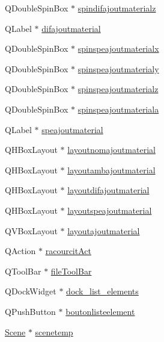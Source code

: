 \begin{DoxyCompactItemize}
\item 
Q\+Double\+Spin\+Box $\ast$ \hyperlink{class_main_window_adbf1bc80b252c00419abec7da5e19913}{spindifajoutmaterialz}
\item 
Q\+Label $\ast$ \hyperlink{class_main_window_a8bbcda89f3ac6367c000056b7e6acb5f}{difajoutmaterial}
\item 
Q\+Double\+Spin\+Box $\ast$ \hyperlink{class_main_window_a41b46a41873912e43f60feafeec48f2f}{spinspeajoutmaterialx}
\item 
Q\+Double\+Spin\+Box $\ast$ \hyperlink{class_main_window_af5f3e81215640c685afbe36ea30926eb}{spinspeajoutmaterialy}
\item 
Q\+Double\+Spin\+Box $\ast$ \hyperlink{class_main_window_abfa1370458910b22754b3a2f9dcf8079}{spinspeajoutmaterialz}
\item 
Q\+Double\+Spin\+Box $\ast$ \hyperlink{class_main_window_ada80e183d94aca69af5b4b413b283a41}{spinspeajoutmateriala}
\item 
Q\+Label $\ast$ \hyperlink{class_main_window_a464561ddbc54d9ced72ad2e1bd76c582}{speajoutmaterial}
\item 
Q\+H\+Box\+Layout $\ast$ \hyperlink{class_main_window_adf5b4cec63e1fb74cfa99d9ff9e72b8d}{layoutnomajoutmaterial}
\item 
Q\+H\+Box\+Layout $\ast$ \hyperlink{class_main_window_ac7c260f905c9235339c200e7fa4e6258}{layoutambajoutmaterial}
\item 
Q\+H\+Box\+Layout $\ast$ \hyperlink{class_main_window_acf1014fb28677dc578d33bf3c4b8729b}{layoutdifajoutmaterial}
\item 
Q\+H\+Box\+Layout $\ast$ \hyperlink{class_main_window_adac5730b1a8e83ec6c59d531d9f7ba4e}{layoutspeajoutmaterial}
\item 
Q\+V\+Box\+Layout $\ast$ \hyperlink{class_main_window_a377ec350ecc66336f8d5540670999b3a}{layoutajoutmaterial}
\item 
Q\+Action $\ast$ \hyperlink{class_main_window_a5abf7bab9a2c85168545220c9984fdfe}{racourcit\+Act}
\item 
Q\+Tool\+Bar $\ast$ \hyperlink{class_main_window_a0a352c6d66b7a080fcf558874a7e51d4}{file\+Tool\+Bar}
\item 
Q\+Dock\+Widget $\ast$ \hyperlink{class_main_window_ab0e654c3c8f22ae05433da58c112f155}{dock\+\_\+list\+\_\+elements}
\item 
Q\+Push\+Button $\ast$ \hyperlink{class_main_window_af87ab6bb1e48500cc732286cc98b990e}{boutonlisteelement}
\item 
\hyperlink{class_scene}{Scene} $\ast$ \hyperlink{class_main_window_ab3b59f5d30eaedb1281da2b817c17fdf}{scenetemp}

\end{DoxyCompactItemize}
